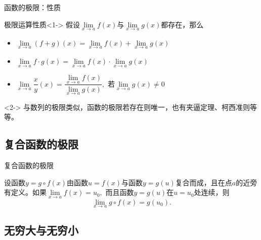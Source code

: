 \begin{frame}{函数的极限：性质}

\begin{block}{极限运算性质}<1->
假设$\lim\limits_{x\to a}f(x)$与$\lim\limits_{x\to a}g(x)$都存在，那么
\begin{itemize}
\item $\lim\limits_{x\to a}(f+g)(x) = \lim\limits_{x\to a}f(x)+\lim\limits_{x\to a}g(x)$
\item $\lim\limits_{x\to a}f\cdot g(x) = \lim\limits_{x\to a}f(x)\cdot\lim\limits_{x\to a}g(x)$
\item $\lim\limits_{x\to a}\dfrac{x}{y}(x) = \dfrac{\lim\limits_{x\to a}f(x)}{\lim\limits_{x\to a}g(x)},$ 若$\lim\limits_{x\to a}g(x)\neq0$
\end{itemize}
\end{block}

\begin{remark}<2->
与数列的极限类似，函数的极限若存在则唯一，也有夹逼定理、柯西准则等等。
\end{remark}

\end{frame}


\subsection{复合函数的极限}


\begin{frame}{复合函数的极限}

\begin{thm}[复合函数的极限]
设函数$y = g\circ f(x)$由函数$u = f(x)$与函数$y = g(u)$复合而成，且在点$a$的近旁有定义。如果$\lim\limits_{x\to a}f(x) = u_0,$ 而且函数$y = g(u)$在$u=u_{0}$处连续，则
$$\lim\limits_{x\to a} g\circ f(x) = g(u_0).$$
\end{thm}

\end{frame}


\subsection{无穷大与无穷小}


